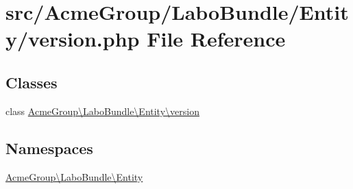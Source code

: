 \hypertarget{_labo_bundle_2_entity_2version_8php}{\section{src/\+Acme\+Group/\+Labo\+Bundle/\+Entity/version.php File Reference}
\label{_labo_bundle_2_entity_2version_8php}
}
\subsection*{Classes}
\begin{DoxyCompactItemize}
\item 
class \hyperlink{class_acme_group_1_1_labo_bundle_1_1_entity_1_1version}{Acme\+Group\textbackslash{}\+Labo\+Bundle\textbackslash{}\+Entity\textbackslash{}version}
\end{DoxyCompactItemize}
\subsection*{Namespaces}
\begin{DoxyCompactItemize}
\item 
 \hyperlink{namespace_acme_group_1_1_labo_bundle_1_1_entity}{Acme\+Group\textbackslash{}\+Labo\+Bundle\textbackslash{}\+Entity}
\end{DoxyCompactItemize}
